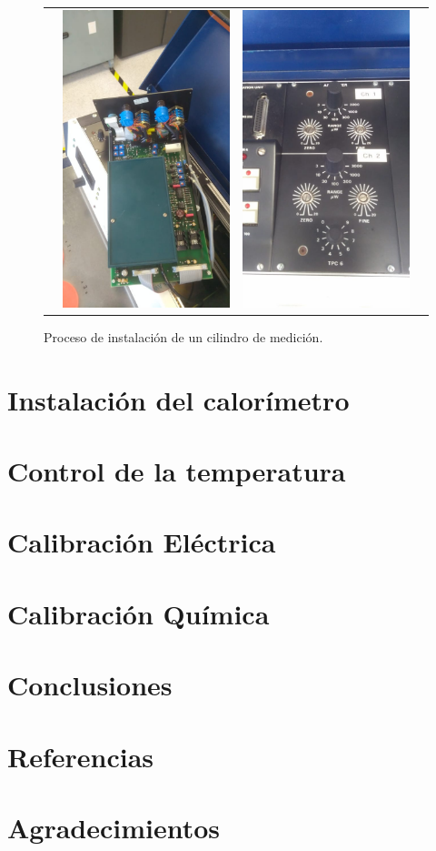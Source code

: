 \documentclass[a0]{sciposter}
\begin{document}
\begin{multicols}{3}
\begin{figure}
\begin{tabular}{cccc}
			& \includegraphics[width=0.24\linewidth]{../Tesis/Figures/process/p3} & \includegraphics[width=0.24\linewidth]{../Tesis/Figures/process/p4} \\
		\end{tabular}
		\caption{Proceso de instalación de un cilindro de medición.}
	\end{figure}

\section{Instalaci\'on del calor\'imetro}
\section{Control de la temperatura}
\section{Calibraci\'on El\'ectrica}
\section{Calibraci\'on Qu\'imica}
\section{Conclusiones}
\section*{Referencias}
\section*{Agradecimientos}



\end{multicols}
\end{document}
